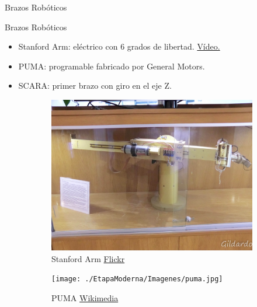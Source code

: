 \begin{frame}[fragile]{Brazos Robóticos}
\vspace{10px}
\pause
{}
\begin{block}{Brazos Robóticos}
	\begin{itemize}
		\item Stanford Arm: eléctrico con 6 grados de libertad. \href{https://www.youtube.com/watch?v=r4aNOM3IK7A}{Vídeo.}
		\pause
		\item PUMA: programable fabricado por General Motors.
		\pause
		\item SCARA: primer brazo con giro en el eje Z.
	\end{itemize}
\end{block}
\begin{figure}
	\centering
	\pause
	\begin{subfigure}{0.33\textwidth}
		\centering
		\includegraphics[scale=0.08]{./EtapaModerna/Imagenes/stanford_arm.jpg}
		\caption{Stanford Arm \href{https://www.flickr.com/photos/gildardo/6186967797}{Flickr}}
	\end{subfigure}
	\pause
	\begin{subfigure}{0.32\textwidth}
		\centering
		\texttt{[image: ./EtapaModerna/Imagenes/puma.jpg]}
		\caption{PUMA \href{https://es.m.wikipedia.org/wiki/Archivo:Puma_Robotic_Arm_-_GPN-2000-001817.jpg}{Wikimedia}}
	\end{subfigure}
	\pause
	\begin{subfigure}{0.33\textwidth}
		\centering

\end{subfigure}
\end{figure}
\end{frame}
